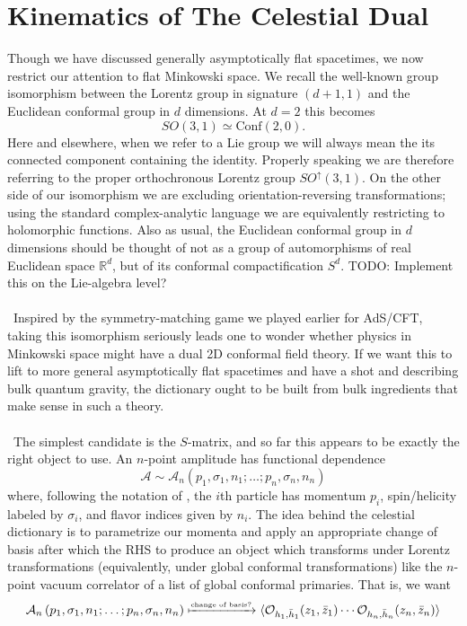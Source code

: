 \documentclass[11pt,letterpaper]{article}
\newcommand{\LP}{\left(}
\newcommand{\RP}{\right)}
\newcommand{\mc}[1]{\mathcal{#1}}
\newcommand{\R}{\mathbb{R}}
\begin{document}
\section{Kinematics of The Celestial Dual}
Though we have discussed generally asymptotically flat spacetimes, we now restrict our attention to flat Minkowski space. We recall the well-known group isomorphism between the Lorentz group in signature $(d+1,1)$ and the Euclidean conformal group in $d$ dimensions. At $d = 2$ this becomes
\begin{equation}
SO(3,1) \simeq \mbox{Conf}(2,0).
\end{equation}
Here and elsewhere, when we refer to a Lie group we will always mean the its connected component containing the identity. Properly speaking we are therefore referring to the proper orthochronous Lorentz group $SO^\uparrow(3,1)$. On the other side of our isomorphism we are excluding orientation-reversing transformations;  using the standard complex-analytic language we are equivalently restricting to holomorphic functions. Also as usual, the Euclidean conformal group in $d$ dimensions should be thought of not as a group of automorphisms of real Euclidean space $\R^d$, but of its conformal compactification $S^d$.
TODO: Implement this on the Lie-algebra level?\\
\\
\
Inspired by the symmetry-matching game we played earlier for AdS/CFT, taking this isomorphism seriously leads one to wonder whether physics in Minkowski space might have a dual 2D conformal field theory. If we want this to lift to more general asymptotically flat spacetimes and have a shot and describing bulk quantum gravity, the dictionary ought to be built from bulk ingredients that make sense in such a theory. \\
\\
\
The simplest candidate is the $S$-matrix, and so far this appears to be exactly the right object to use. An $n$-point amplitude has functional dependence \begin{equation}
\mc{A} \sim \mc{A}_n \LP p_1, \sigma_1, n_1; \ldots; p_n, \sigma_n, n_n \RP
\end{equation}
where, following the notation of \cite{Weinberg:1995mt}, the $i$th particle has momentum $p_i$, spin/helicity labeled by $\sigma_i$, and flavor indices given by $n_i$. The idea behind the celestial dictionary is to parametrize our momenta and apply an appropriate change of basis after which the RHS to produce an object which transforms under Lorentz transformations (equivalently, under global conformal transformations) like the $n$-point vacuum correlator of a list of global conformal primaries. That is, we want \begin{equation}
\mc{A}_n \LP p_1, \sigma_1, n_1; \ldots; p_n, \sigma_n, n_n \RP \xmapsto{\mbox{\tiny{change of basis?}}} \langle \mc{O}_{h_1, \bar{h}_1}(z_1, \bar{z}_1) \cdots \mc{O}_{h_n, \bar{h}_n}(z_n, \bar{z}_n) \rangle
\end{equation}
\end{document}
